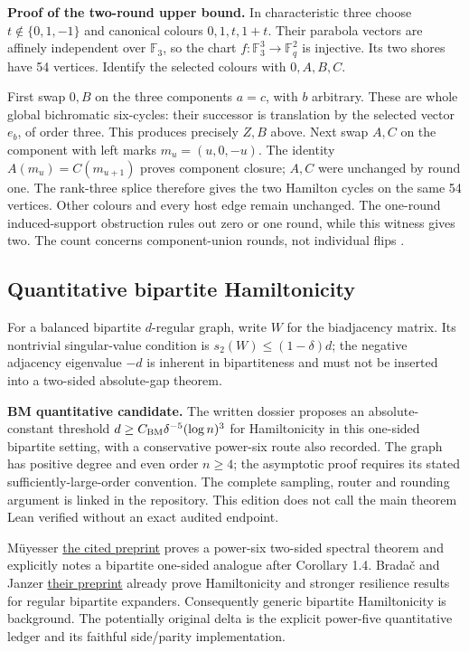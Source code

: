 \documentclass[smallextended]{svjour3}
\begin{document}
\textbf{Proof of the two-round upper bound.} In characteristic three
choose \(t\notin\{0,1,-1\}\) and canonical colours \(0,1,t,1+t\). Their
parabola vectors are affinely independent over \(\mathbb F_3\), so the
chart \(f:\mathbb F_3^3\to\mathbb F_q^2\) is injective. Its two shores
have 54 vertices. Identify the selected colours with \(0,A,B,C\).

First swap \(0,B\) on the three components \(a=c\), with \(b\)
arbitrary. These are whole global bichromatic six-cycles: their
successor is translation by the selected vector \(e_b\), of order three.
This produces precisely \(Z,B\) above. Next swap \(A,C\) on the
component with left marks \(m_u=(u,0,-u)\). The identity
\(A(m_u)=C(m_{u+1})\) proves component closure; \(A,C\) were unchanged
by round one. The rank-three splice therefore gives the two Hamilton
cycles on the same 54 vertices. Other colours and every host edge remain
unchanged. The one-round induced-support obstruction rules out zero or
one round, while this witness gives two. The count concerns
component-union rounds, not individual flips \cite{ref11}.

\subsection{Quantitative bipartite
Hamiltonicity}\label{quantitative-bipartite-hamiltonicity}

For a balanced bipartite \(d\)-regular graph, write \(W\) for the
biadjacency matrix. Its nontrivial singular-value condition is
\(s_2(W)\leq(1-\delta)d\); the negative adjacency eigenvalue \(-d\) is
inherent in bipartiteness and must not be inserted into a two-sided
absolute-gap theorem.

\textbf{BM quantitative candidate.} The written dossier proposes an
absolute-constant threshold \(d\geq C_{\rm BM}\delta^{-5}(\log n)^3\)
for Hamiltonicity in this one-sided bipartite setting, with a
conservative power-six route also recorded. The graph has positive
degree and even order \(n\geq4\); the asymptotic proof requires its
stated sufficiently-large-order convention. The complete sampling,
router and rounding argument is linked in the repository. This edition
does not call the main theorem Lean verified without an exact audited
endpoint.

Müyesser \href{https://arxiv.org/html/2609.35766v1}{the cited preprint}
proves a power-six two-sided spectral theorem and explicitly notes a
bipartite one-sided analogue after Corollary 1.4. Bradač and Janzer
\href{https://arxiv.org/html/2605.15043v1}{their preprint} already prove
Hamiltonicity and stronger resilience results for regular bipartite
expanders. Consequently generic bipartite Hamiltonicity is background.
The potentially original delta is the explicit power-five quantitative
ledger and its faithful side/parity implementation.
\end{document}
